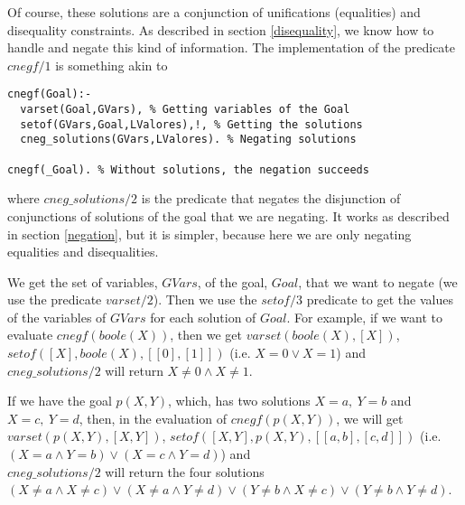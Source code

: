 \documentclass{llncs}
\newcommand{\entails}{\models}
\newcommand{\vecy}{\overline{y}}
\begin{document}
Of course, these solutions are a conjunction of unifications
(equalities) and disequality constraints. As described in section
\ref{disequality}, we know how to handle and negate this kind of
information. The implementation of the predicate $cnegf/1$ is
something akin to

{\small
\begin{verbatim}
cnegf(Goal):-
  varset(Goal,GVars), % Getting variables of the Goal
  setof(GVars,Goal,LValores),!, % Getting the solutions
  cneg_solutions(GVars,LValores). % Negating solutions

cnegf(_Goal). % Without solutions, the negation succeeds
\end{verbatim}
}
\noindent
where $cneg\_solutions/2$ is the predicate that negates the disjunction
of conjunctions of solutions of the goal that we are negating. It
works as described in section \ref{negation}, but it is simpler,
because here we are only negating equalities and disequalities.

We get the set of variables, $GVars$, of the goal, $Goal$, that we
want to negate (we use the predicate $varset/2$). Then we use the
$setof/3$ predicate to get the values of the variables of $GVars$
 for each solution of $Goal$. For example, if we want to
evaluate $cnegf(boole(X))$, then we get $varset(boole(X),[X])$,
$setof([X],boole(X),[[0],[1]])$ (i.e. $X=0 \vee X=1$) and
$cneg\_solutions/2$ will return $X \neq 0
\wedge X \neq 1$. 

If we have the goal $p(X,Y)$, which, has two solutions $X=a,~Y=b$ and
$X=c,~Y=d$, then, in the evaluation of $cnegf(p(X,Y))$, we will get
$varset(p(X,Y),[X,Y])$, $setof([X,Y],p(X,Y),[[a,b],[c,d]])$
(i.e. $(X=a \wedge Y=b) \vee (X=c \wedge Y=d)$) and \\$cneg\_solutions/2$
will return the four solutions $(X \neq a \wedge X \neq c) \vee (X
\neq a \wedge Y \neq d) \vee (Y \neq b \wedge X \neq c) \vee (Y \neq b
\wedge Y \neq d)$.




\end{document}
